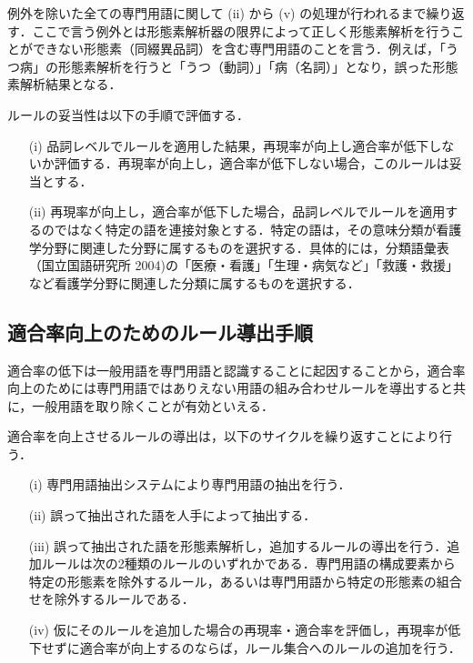 \documentclass[japanese]{jnlp_1.4}
\begin{document}
例外を除いた全ての専門用語に関して (ii) から (v) の処理が行われるまで繰り返す．ここで言う例外とは形態素解析器の限界によって正しく形態素解析を行うことができない形態素（同綴異品詞）を含む専門用語のことを言う．例えば，「うつ病」の形態素解析を行うと「うつ（動詞）」「病（名詞）」となり，誤った形態素解析結果となる．

ルールの妥当性は以下の手順で評価する．

\begin{itemize}
\item[(i)]
品詞レベルでルールを適用した結果，再現率が向上し適合率が低下しないか評価する．再現率が向上し，適合率が低下しない場合，このルールは妥当とする．

\item[(ii)]
再現率が向上し，適合率が低下した場合，品詞レベルでルールを適用するのではなく特定の語を連接対象とする．特定の語は，その意味分類が看護学分野に関連した分野に属するものを選択する．具体的には，分類語彙表（国立国語研究所 2004)の「医療・看護」「生理・病気など」「救護・救援」など看護学分野に関連した分類に属するものを選択する．
\end{itemize}


\subsection{適合率向上のためのルール導出手順}

適合率の低下は一般用語を専門用語と認識することに起因することから，適合率向上のためには専門用語ではありえない用語の組み合わせルールを導出すると共に，一般用語を取り除くことが有効といえる．

適合率を向上させるルールの導出は，以下のサイクルを繰り返すことにより行う．

\begin{itemize}
\item[(i)]
専門用語抽出システムにより専門用語の抽出を行う．

\item[(ii)]
誤って抽出された語を人手によって抽出する．

\item[(iii)]
誤って抽出された語を形態素解析し，追加するルールの導出を行う．追加ルールは次の2種類のルールのいずれかである．専門用語の構成要素から特定の形態素を除外するルール，あるいは専門用語から特定の形態素の組合せを除外するルールである．

\item[(iv)]
仮にそのルールを追加した場合の再現率・適合率を評価し，再現率が低下せずに適合率が向上するのならば，ルール集合へのルールの追加を行う．
\end{itemize}
\end{document}
